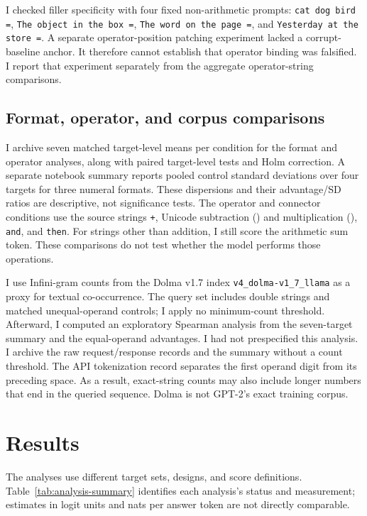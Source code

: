 \documentclass[11pt]{article}
\begin{document}
I checked filler specificity with four fixed non-arithmetic prompts: \texttt{cat dog bird =}, \texttt{The object in the box =}, \texttt{The word on the page =}, and \texttt{Yesterday at the store =}. A separate operator-position patching experiment lacked a corrupt-baseline anchor. It therefore cannot establish that operator binding was falsified. I report that experiment separately from the aggregate operator-string comparisons.

\subsection{Format, operator, and corpus comparisons}

I archive seven matched target-level means per condition for the format and operator analyses, along with paired target-level tests and Holm correction. A separate notebook summary reports pooled control standard deviations over four targets for three numeral formats. These dispersions and their advantage/SD ratios are descriptive, not significance tests. The operator and connector conditions use the source strings \texttt{+}, Unicode subtraction (\texttt{\textminus}) and multiplication (\texttt{\texttimes}), \texttt{and}, and \texttt{then}. For strings other than addition, I still score the arithmetic sum token. These comparisons do not test whether the model performs those operations.

I use Infini-gram counts from the Dolma v1.7 index \texttt{v4\_dolma-v1\_7\_llama} as a proxy for textual co-occurrence. The query set includes double strings and matched unequal-operand controls; I apply no minimum-count threshold. Afterward, I computed an exploratory Spearman analysis from the seven-target summary and the equal-operand advantages. I had not prespecified this analysis. I archive the raw request/response records and the summary without a count threshold. The API tokenization record separates the first operand digit from its preceding space. As a result, exact-string counts may also include longer numbers that end in the queried sequence. Dolma is not GPT-2's exact training corpus.

\section{Results}

The analyses use different target sets, designs, and score definitions. Table~\ref{tab:analysis-summary} identifies each analysis's status and measurement; estimates in logit units and nats per answer token are not directly comparable.
\end{document}
